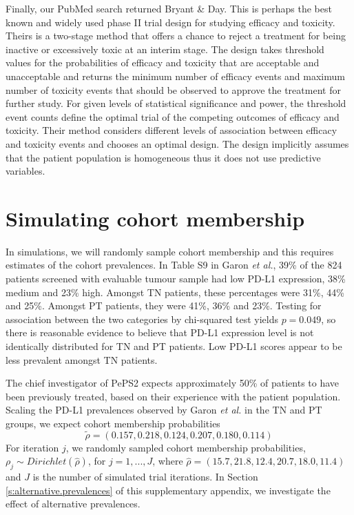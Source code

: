 \documentclass{article}
\begin{document}
Finally, our PubMed search returned Bryant \& Day\cite{Bryant1995}.
This is perhaps the best known and widely used phase II trial design for studying efficacy and toxicity.
Theirs is a two-stage method that offers a chance to reject a treatment for being inactive or excessively toxic at an interim stage.
The design takes threshold values for the probabilities of efficacy and toxicity that are acceptable and unacceptable and returns the minimum number of efficacy events and maximum number of toxicity events that should be observed to approve the treatment for further study.
For given levels of statistical significance and power, the threshold event counts define the optimal trial of the competing outcomes of efficacy and toxicity.
Their method considers different levels of association between efficacy and toxicity events and chooses an optimal design.
The design implicitly assumes that the patient population is homogeneous thus it does not use predictive variables.





\section{Simulating cohort membership}
In simulations, we will randomly sample cohort membership and this requires estimates of the cohort prevalences.
In Table S9 in Garon \textit{et al.}\cite{Garon2015}, 39\% of the 824 patients screened with evaluable tumour sample had low PD-L1 expression, 38\% medium and 23\% high.
Amongst TN patients, these percentages were 31\%, 44\% and 25\%.
Amongst PT patients, they were 41\%, 36\% and 23\%.
Testing for association between the two categories by chi-squared test yields $p = 0.049$, so there is reasonable evidence to believe that PD-L1 expression level is not identically distributed for TN and PT patients.
Low PD-L1 scores appear to be less prevalent amongst TN patients.

The chief investigator of PePS2 expects approximately 50\% of patients to have been previously treated, based on their experience with the patient population.
Scaling the PD-L1 prevalences observed by Garon \textit{et al.} in the TN and PT groups, we expect cohort membership probabilities 
\[ \tilde{\rho} = (0.157, 0.218, 0.124, 0.207, 0.180, 0.114) \]
For iteration $j$, we randomly sampled cohort membership probabilities, $\rho_j \sim Dirichlet(\hat{\rho})$, for $j=1,...,J$, where $\hat{\rho} = (15.7, 21.8, 12.4, 20.7, 18.0, 11.4)$ and $J$ is the number of simulated trial iterations.
In Section \ref{s:alternative.prevalences} of this supplementary appendix, we investigate the effect of alternative prevalences.
\end{document}

